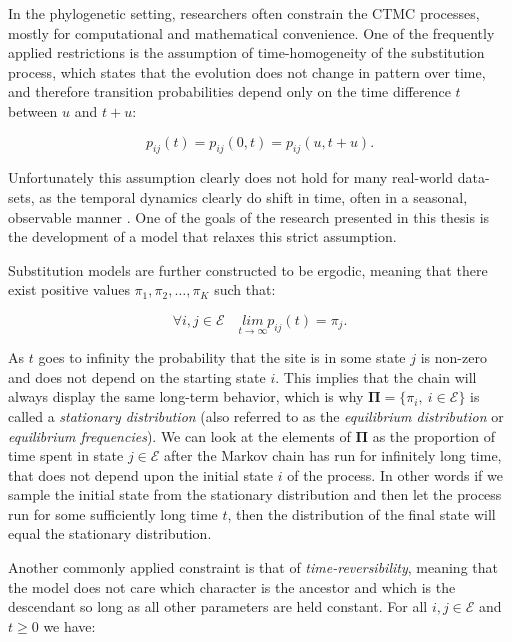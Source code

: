 In the phylogenetic setting, researchers often constrain the CTMC processes, mostly for computational and mathematical convenience.
One of the frequently applied restrictions is the assumption of time-homogeneity of the substitution process, which states that the evolution does not change in pattern over time, and therefore transition probabilities depend only on the time difference $t$ between $u$ and $t + u$:

\begin{equation}
p_{ij}\left(t\right) = p_{ij}\left(0,t\right) = p_{ij}\left(u,t+u\right).
\label{eq:time_homogeneity}
\end{equation}

Unfortunately this assumption clearly does not hold for many real-world data-sets, as the temporal dynamics clearly do shift in time, often in a seasonal, observable manner \citep{Bahl2011}.
One of the goals of the research presented in this thesis is the development of a model that relaxes this strict assumption.

Substitution models are further constructed to be ergodic, meaning that there exist positive values $\pi_{1},\pi_{2},\ldots,\pi_{K}$ such that:

\begin{equation}
\forall i,j\in \mathcal{E}  \quad\underset{t\rightarrow\infty}{lim}p_{ij}(t)=\pi_{j}.
\label{eq:ergodicity}
\end{equation}


As $t$ goes to infinity the probability that the site is in some state $j$ is non-zero and does not depend on the starting state $i$.
This implies that the chain will always display the same long-term behavior, which is why $\mathbf{\Pi}=\{\pi_{i},\ i\in\mathcal{E}\}$ is called a \emph{stationary distribution} (also referred to as the \emph{equilibrium distribution} or \emph{equilibrium frequencies}).
We can look at the elements of $\mathbf{\Pi}$ as the proportion of time spent in state $j\in\mathcal{E}$ after the Markov chain has run for infinitely long time, that does not depend upon the initial state $i$ of the process.
In other words if we sample the initial state from the stationary distribution and then let the process run for some sufficiently long time $t$, then the distribution of the final state will equal the stationary distribution. 

Another commonly applied constraint is that of \emph{time-reversibility}, meaning that the model does not care which character is the ancestor and which is the descendant so long as all other parameters are held constant.
For all $i,j\in \mathcal{E}$ and $t\geq 0$ we have:

